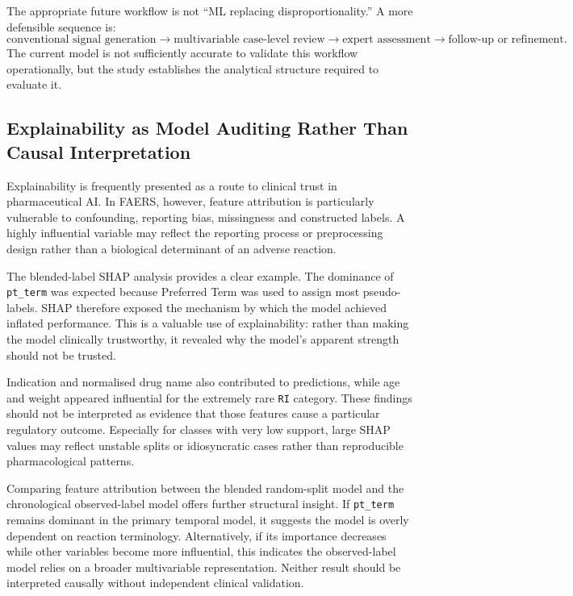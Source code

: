 \documentclass[10pt]{article}
\begin{document}
The appropriate future workflow is not ``ML replacing disproportionality.'' A more defensible sequence is:
\begin{equation}
\text{conventional signal generation} \longrightarrow \text{multivariable case-level review} \longrightarrow \text{expert assessment} \longrightarrow \text{follow-up or refinement}.
\end{equation}
The current model is not sufficiently accurate to validate this workflow operationally, but the study establishes the analytical structure required to evaluate it.

\subsection{Explainability as Model Auditing Rather Than Causal Interpretation}
Explainability is frequently presented as a route to clinical trust in pharmaceutical AI. In FAERS, however, feature attribution is particularly vulnerable to confounding, reporting bias, missingness and constructed labels. A highly influential variable may reflect the reporting process or preprocessing design rather than a biological determinant of an adverse reaction.

The blended-label SHAP analysis provides a clear example. The dominance of \texttt{pt\_term} was expected because Preferred Term was used to assign most pseudo-labels. SHAP therefore exposed the mechanism by which the model achieved inflated performance. This is a valuable use of explainability: rather than making the model clinically trustworthy, it revealed why the model's apparent strength should not be trusted.

Indication and normalised drug name also contributed to predictions, while age and weight appeared influential for the extremely rare \texttt{RI} category. These findings should not be interpreted as evidence that those features cause a particular regulatory outcome. Especially for classes with very low support, large SHAP values may reflect unstable splits or idiosyncratic cases rather than reproducible pharmacological patterns.

Comparing feature attribution between the blended random-split model and the chronological observed-label model offers further structural insight. If \texttt{pt\_term} remains dominant in the primary temporal model, it suggests the model is overly dependent on reaction terminology. Alternatively, if its importance decreases while other variables become more influential, this indicates the observed-label model relies on a broader multivariable representation. Neither result should be interpreted causally without independent clinical validation.
\end{document}
